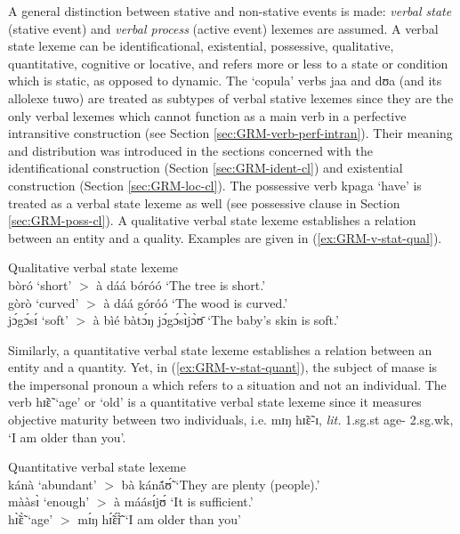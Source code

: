 \begin{exe}
\begin{exe}
\begin{exe}
{\begin{exe}
\begin{exe}
\begin{exe}
\begin{exe}
\begin{exe}
\begin{exe}
\begin{exe}
\begin{exe}
\begin{exe}
\begin{exe}
\begin{exe}
\begin{exe}
\begin{exe}
\begin{exe}
\begin{exe}
\begin{exe}
\begin{exe}
\begin{exe}
\begin{exe}
A general distinction
between stative and non-stative events  is made: {\it verbal state} (stative
event) and {\it verbal process} (active event) 
lexemes are assumed. A verbal state lexeme can be identificational,
existential, possessive,  qualitative, quantitative, cognitive or  locative, and
refers more or less to a state or condition which is static, as opposed to
dynamic. The `copula' verbs {\sls jaa} and {\sls dʊa} (and its allolexe {\sls 
tuwo})
are treated as subtypes of verbal stative lexemes since they are the only verbal
lexemes which cannot function as a main verb in  a perfective intransitive
construction (see Section \ref{sec:GRM-verb-perf-intran}). Their meaning and
distribution was introduced in the sections concerned with the identificational
construction (Section \ref{sec:GRM-ident-cl}) and existential construction
(Section \ref{sec:GRM-loc-cl}).  The possessive verb
{\sls kpaga} `have'  is treated as  a verbal state lexeme as well (see 
possessive
clause in Section   \ref{sec:GRM-poss-cl}).  A qualitative verbal state lexeme
establishes a relation between an entity and a quality. Examples are given in
(\ref{ex:GRM-v-stat-qual}).


\ea\label{ex:GRM-v-stat-qual}{\rm Qualitative verbal state lexeme}\\

 {\sls bòró}  `short'  $>$ {\sls à dáá bóróó} {\rm  `The tree is short.'}\\
{\sls gòrò} `curved'  $>$ {\sls à dáá góróó} {\rm  `The wood is curved.'}\\
{\sls jɔ́gɔ́sɪ́} `soft'   $>$ {\sls   à bìé bàtɔ́ŋ jɔ́gɔ́sɪ̀jɔ̀ʊ̄} {\rm    `The 
baby's
skin is soft.'}
\z

Similarly, a quantitative verbal state lexeme  establishes a relation between an
entity and a quantity. Yet, in (\ref{ex:GRM-v-stat-quant}), the subject of   
{\sls maase} is the impersonal pronoun {\sls a} which refers to a situation and 
not an
individual. The verb {\sls hɪ̃ɛ̃}  `age' or `old'  is a quantitative verbal 
state
lexeme since it  measures  objective maturity between
two individuals, i.e. {\sls mɪŋ hɪ̃ɛ̃-ɪ}, {\it lit.} {\sc 1.sg.st} age-{\sc
2.sg.wk}, `I am older than you'. 


\ea\label{ex:GRM-v-stat-quant}{\rm Quantitative verbal state lexeme}\\

 {\sls kánà}  `abundant'  $>$ {\sls bà kánã́ʊ̃́} {\rm   `They are plenty 
(people).'} 
\\
{\sls mààsɪ̀} `enough'  $>$   {\sls à máásɪ́jʊ́} {\rm    `It is sufficient.'}\\
{\sls hɪ̃̀ɛ̃̀} `age' $>$ {\sls mɪ́ŋ hɪ̃́ɛ̃́ɪ̃̀} {\rm    `I am older than you'}
\z


\end{exe}
\end{exe}
\end{exe}
\end{exe}
\end{exe}
\end{exe}
\end{exe}
\end{exe}
\end{exe}
\end{exe}
\end{exe}
\end{exe}
\end{exe}
\end{exe}
\end{exe}
\end{exe}
\end{exe}
\end{exe}
\end{exe}}
\end{exe}
\end{exe}
\end{exe}
